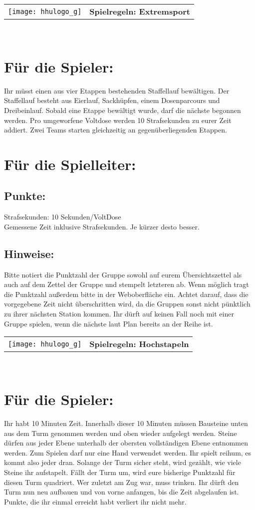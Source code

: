 \documentclass[a4paper,10pt]{article}
\def\spielb{Extremsport}
\def\spielc{Hochstapeln}
\newcommand{\unten}{
 Bitte notiert die Punktzahl der Gruppe sowohl auf eurem Übersichtszettel als auch auf dem Zettel der Gruppe und stempelt letzteren ab. Wenn möglich tragt die Punktzahl außerdem bitte in der Weboberfläche ein.
 Achtet darauf, dass die vorgegebene Zeit nicht überschritten wird, da die Gruppen sonst nicht pünktlich zu ihrer nächsten Station kommen. Ihr dürft auf keinen Fall noch mit einer Gruppe spielen, wenn die nächste laut Plan bereits an der Reihe ist.
}
\begin{document}
  \begin{tabularx}{\textwidth}{lc}
    \texttt{[image: hhulogo\_g]}
  & {\Huge \textbf{Spielregeln: \spielb}}
  \end{tabularx}\\

\Large
\section*{Für die Spieler:}
Ihr müsst einen aus vier Etappen bestehenden Staffellauf bewältigen. 
Der Staffellauf besteht aus Eierlauf, Sackhüpfen, einem Dosenparcours und 
Dreibeinlauf. Sobald eine Etappe bewältigt wurde, darf die nächste begonnen
werden. Pro umgeworfene Voltdose werden 10 Strafsekunden zu eurer Zeit 
addiert. Zwei Teams starten gleichzeitig an gegenüberliegenden Etappen.

\section*{Für die Spielleiter:}
\subsection*{Punkte:}
Strafsekunden: 10 Sekunden/VoltDose\\
Gemessene Zeit inklusive Strafsekunden. Je kürzer desto besser.

\subsection*{Hinweise:}
\unten

\newpage


  \begin{tabularx}{\textwidth}{lc}
    \texttt{[image: hhulogo\_g]}
  & {\Huge \textbf{Spielregeln: \spielc}}
  \end{tabularx}\\

\Large
\section*{Für die Spieler:}
Ihr habt 10 Minuten Zeit. Innerhalb dieser 10 Minuten müssen Bausteine unten aus dem Turm genommen werden und oben wieder aufgelegt werden. Steine dürfen aus jeder Ebene unterhalb der obersten vollständigen Ebene entnommen werden. Zum Spielen darf nur eine Hand verwendet werden. Ihr spielt reihum, es kommt also jeder dran. Solange der Turm sicher steht, wird gezählt, wie viele Steine ihr aufstapelt. Fällt der Turm um, wird eure bisherige Punktzahl für diesen Turm quadriert. Wer zuletzt am Zug war, muss trinken. Ihr dürft den Turm nun neu aufbauen und von vorne anfangen, bis die Zeit abgelaufen ist. Punkte, die ihr einmal erreicht habt verliert ihr nicht mehr.
\end{document}
